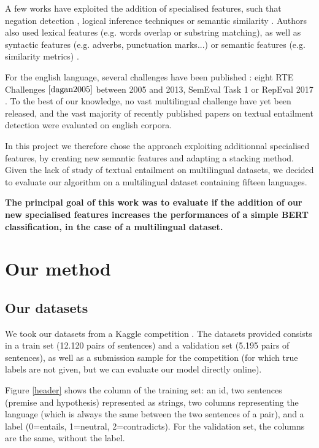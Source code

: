 \documentclass[final]{cvpr}
\begin{document}
A few works have exploited the addition of specialised features, such that negation detection \cite{androu2009}, logical inference techniques \cite{bos2005} or semantic similarity \cite{lai2014}. Authors also used lexical features (e.g. words overlap or substring matching), as well as syntactic features (e.g. adverbs, punctuation marks...) or semantic features (e.g. similarity metrics) \cite{Rocha2018}.

For the english language, several challenges have been published : eight RTE Challenges $\cite{dagan2005}$ between 2005 and 2013, SemEval Task 1 \cite{marelli2014} or RepEval 2017 \cite{nangia2017}. To the best of our knowledge, no vast multilingual challenge have yet been released, and the vast majority of recently published papers on textual entailment detection were evaluated on english corpora.

In this project we therefore chose the approach exploiting additionnal specialised features, by creating new semantic features and adapting a stacking method. Given the lack of study of textual entailment on multilingual datasets, we decided to evaluate our algorithm on a multilingual dataset containing fifteen languages.

\textbf{The principal goal of this work was to evaluate if the addition of our new specialised features increases the performances of a simple BERT classification, in the case of a multilingual dataset.}

\section{Our method}

\subsection{Our datasets}

We took our datasets from a Kaggle competition \cite{competition}. The datasets provided consists in a train set (12.120 pairs of sentences) and a validation set (5.195 pairs of sentences), as well as a submission sample for the competition (for which true labels are not given, but we can evaluate our model directly online). 

Figure \ref{header} shows the column of the training set: an id, two sentences (premise and hypothesis) represented as strings, two columns representing the language (which is always the same between the two sentences of a pair), and a label (0=entails, 1=neutral, 2=contradicts). For the validation set, the columns are the same, without the label.
\end{document}
